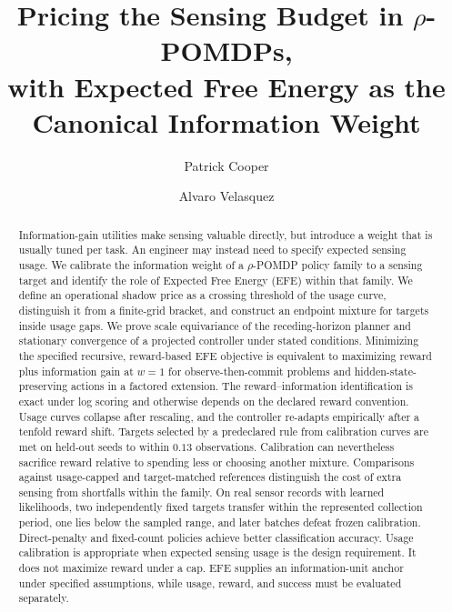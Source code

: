 \documentclass[runningheads]{llncs}
\begin{document}
\title{Pricing the Sensing Budget in $\rho$-POMDPs,\\
with Expected Free Energy as the Canonical Information Weight}


\author{Patrick Cooper \and Alvaro Velasquez}



\maketitle

\begin{abstract}
Information-gain utilities make sensing valuable directly, but introduce a weight that is usually tuned per task. An engineer may instead need to specify expected sensing usage.
We calibrate the information weight of a $\rho$-POMDP policy family to a sensing target and identify the role of Expected Free Energy (EFE) within that family.
We define an operational shadow price as a crossing threshold of the usage curve, distinguish it from a finite-grid bracket, and construct an endpoint mixture for targets inside usage gaps. We prove scale equivariance of the receding-horizon planner and stationary convergence of a projected controller under stated conditions. Minimizing the specified recursive, reward-based EFE objective is equivalent to maximizing reward plus information gain at $w=1$ for observe-then-commit problems and hidden-state-preserving actions in a factored extension. The reward--information identification is exact under log scoring and otherwise depends on the declared reward convention.
Usage curves collapse after rescaling, and the controller re-adapts empirically after a tenfold reward shift. Targets selected by a predeclared rule from calibration curves are met on held-out seeds to within $0.13$ observations. Calibration can nevertheless sacrifice reward relative to spending less or choosing another mixture. Comparisons against usage-capped and target-matched references distinguish the cost of extra sensing from shortfalls within the family. On real sensor records with learned likelihoods, two independently fixed targets transfer within the represented collection period, one lies below the sampled range, and later batches defeat frozen calibration. Direct-penalty and fixed-count policies achieve better classification accuracy.
Usage calibration is appropriate when expected sensing usage is the design requirement. It does not maximize reward under a cap. EFE supplies an information-unit anchor under specified assumptions, while usage, reward, and success must be evaluated separately.
\end{abstract}
\end{document}
